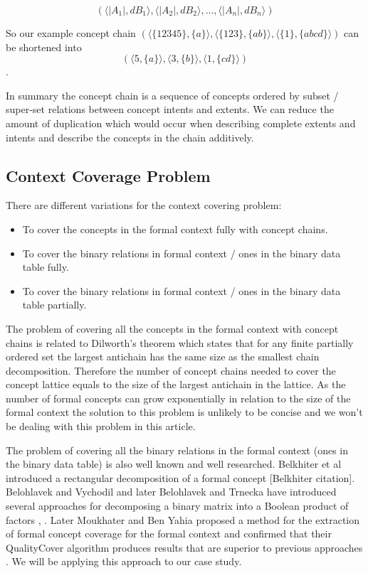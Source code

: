 \documentclass[acmconf,authordraft]{acmart}
\begin{document}
\begin{displaymath}
 (\langle|A_1|, dB_1 \rangle,\langle |A_2|, dB_2 \rangle,  ..., \langle |A_n|, dB_n \rangle)
\end{displaymath}

So our example concept chain 
$(\langle \{12345\}, \{a\} \rangle,
 \langle \{123\}, \{ab\} \rangle,  \langle \{1\}, \{abcd\} \rangle)$
 can be shortened into
 \begin{displaymath}
 (\langle 5, \{a\} \rangle,
 \langle 3, \{b\} \rangle,  
 \langle 1, \{cd\} \rangle)
 \end{displaymath}.

In summary the concept chain is a sequence of concepts ordered by subset / super-set relations between concept intents and extents. We can reduce the amount of duplication which would occur when describing complete extents and intents and describe the concepts in the chain additively.

\subsection{Context Coverage Problem}

There are different variations for the context covering problem:

\begin{itemize}
  \item To cover the concepts in the formal context fully with concept chains.
  \item To cover the binary relations in formal context / ones in the binary data table fully.
  \item To cover the binary relations in formal context / ones in the binary data table partially.
\end{itemize}

The problem of covering all the concepts in the formal context with concept chains is related to Dilworth's theorem \cite{dilworth_decomposition_1950} which states that for any finite partially ordered set the largest antichain has the same size as the smallest chain decomposition. Therefore the number of concept chains needed to cover the concept lattice equals to the size of the largest antichain in the lattice. As the number of formal concepts can grow exponentially in relation to the size of the formal context the solution to this problem is unlikely to be concise and we won't be dealing with this problem in this article.

The problem of covering all the binary relations in the formal context (ones in the binary data table) is also well known and well researched.  Belkhiter et al introduced a rectangular decomposition of a formal concept [Belkhiter citation]. Belohlavek and Vychodil and later Belohlavek and Trnecka have introduced several approaches for decomposing a binary matrix into a Boolean product of factors \cite{belohlavek_discovery_2010}, \cite{belohlavek_-below_2015}. Later Moukhater and Ben Yahia proposed a method for the extraction of formal concept coverage for the formal context and confirmed that their QualityCover algorithm produces results that are superior to previous approaches \cite{mouakher_qualitycover:_2016}. We will be applying this approach to our case study.
\end{document}
